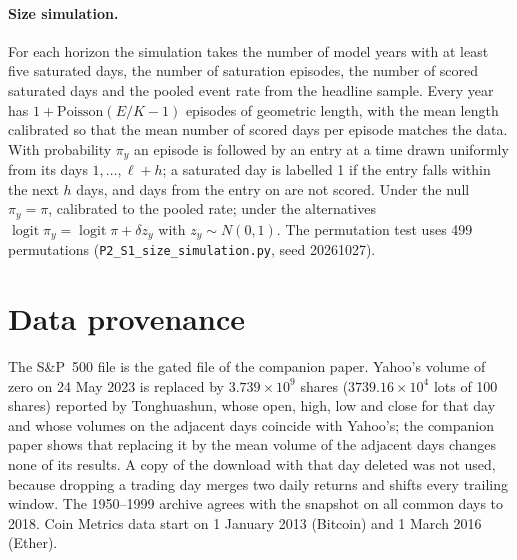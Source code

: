 \documentclass[preprint,12pt,authoryear]{elsarticle}
\begin{document}
\paragraph{Size simulation.} For each horizon the simulation takes the number of model years with at least five saturated days, the number of saturation episodes, the number of scored saturated days and the pooled event rate from the headline sample. Every year has $1+\mathrm{Poisson}(E/K-1)$ episodes of geometric length, with the mean length calibrated so that the mean number of scored days per episode matches the data. With probability $\pi_y$ an episode is followed by an entry at a time drawn uniformly from its days $1,\dots,\ell+h$; a saturated day is labelled 1 if the entry falls within the next $h$ days, and days from the entry on are not scored. Under the null $\pi_y=\pi$, calibrated to the pooled rate; under the alternatives $\operatorname{logit}\pi_y=\operatorname{logit}\pi+\delta z_y$ with $z_y\sim N(0,1)$. The permutation test uses 499 permutations (\nolinkurl{P2_S1_size_simulation.py}, seed 20261027).

\section{Data provenance}\label{app:data}
The S\&P~500 file is the gated file of the companion paper. Yahoo's volume of zero on 24 May 2023 is replaced by $3.739\times10^9$ shares ($3739.16\times10^4$ lots of 100 shares) reported by Tonghuashun, whose open, high, low and close for that day and whose volumes on the adjacent days coincide with Yahoo's; the companion paper shows that replacing it by the mean volume of the adjacent days changes none of its results. A copy of the download with that day deleted was not used, because dropping a trading day merges two daily returns and shifts every trailing window. The 1950--1999 archive agrees with the snapshot on all common days to 2018. Coin Metrics data start on 1 January 2013 (Bitcoin) and 1 March 2016 (Ether).



\end{document}
